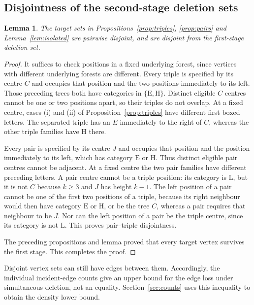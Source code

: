 \documentclass[11pt,a4paper]{article}
\newtheorem{lemma}[theorem]{Lemma}
\theoremstyle{definition}
\theoremstyle{remark}
\newcommand{\E}{\mathrm E}
\newcommand{\HH}{\mathrm H}
\newcommand{\LL}{\mathrm L}
\begin{document}
\subsection{Disjointness of the second-stage deletion sets}\label{sec:disjointness}
\begin{lemma}\label{lem:disjoint}
The target sets in Propositions~\ref{prop:triples}, \ref{prop:pairs} and Lemma~\ref{lem:isolated} are pairwise disjoint, and are disjoint from the first-stage deletion set.
\end{lemma}
\begin{proof}
It suffices to check positions in a fixed underlying forest, since vertices with different underlying forests are different. Every triple is specified by its centre $C$ and occupies that position and the two positions immediately to its left. Those preceding trees both have categories in $\{\E,\HH\}$. Distinct eligible $C$ centres cannot be one or two positions apart, so their triples do not overlap. At a fixed centre, cases (i) and (ii) of Proposition~\ref{prop:triples} have different first boxed letters. The separated triple has an $E$ immediately to the right of $C$, whereas the other triple families have $\HH$ there.

Every pair is specified by its centre $J$ and occupies that position and the position immediately to its left, which has category $\E$ or $\HH$. Thus distinct eligible pair centres cannot be adjacent. At a fixed centre the two pair families have different preceding letters. A pair centre cannot be a triple position: its category is $\LL$, but it is not $C$ because $k\ge3$ and $J$ has height $k-1$. The left position of a pair cannot be one of the first two positions of a triple, because its right neighbour would then have category $\E$ or $\HH$, or be the tree $C$, whereas a pair requires that neighbour to be $J$. Nor can the left position of a pair be the triple centre, since its category is not $\LL$. This proves pair--triple disjointness.

The preceding propositions and lemma proved that every target vertex survives the first stage. This completes the proof.
\end{proof}

Disjoint vertex sets can still have edges between them. Accordingly, the individual incident-edge counts give an upper bound for the edge loss under simultaneous deletion, not an equality. Section~\ref{sec:counts} uses this inequality to obtain the density lower bound.
\end{document}
